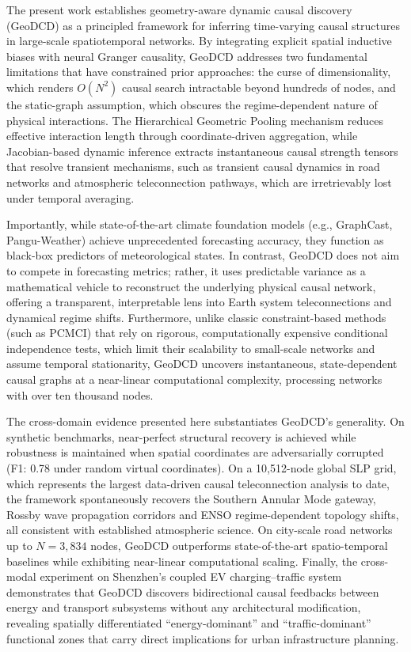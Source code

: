 \documentclass{article}
\begin{document}
The present work establishes geometry-aware dynamic causal discovery (GeoDCD) as a principled framework for inferring time-varying causal structures in large-scale spatiotemporal networks. By integrating explicit spatial inductive biases with neural Granger causality, GeoDCD addresses two fundamental limitations that have constrained prior approaches: the curse of dimensionality, which renders $O(N^2)$ causal search intractable beyond hundreds of nodes, and the static-graph assumption, which obscures the regime-dependent nature of physical interactions. The Hierarchical Geometric Pooling mechanism reduces effective interaction length through coordinate-driven aggregation, while Jacobian-based dynamic inference extracts instantaneous causal strength tensors that resolve transient mechanisms, such as transient causal dynamics in road networks and atmospheric teleconnection pathways, which are irretrievably lost under temporal averaging.

Importantly, while state-of-the-art climate foundation models (e.g., GraphCast, Pangu-Weather) achieve unprecedented forecasting accuracy, they function as black-box predictors of meteorological states. In contrast, GeoDCD does not aim to compete in forecasting metrics; rather, it uses predictable variance as a mathematical vehicle to reconstruct the underlying physical causal network, offering a transparent, interpretable lens into Earth system teleconnections and dynamical regime shifts. Furthermore, unlike classic constraint-based methods (such as PCMCI) that rely on rigorous, computationally expensive conditional independence tests, which limit their scalability to small-scale networks and assume temporal stationarity, GeoDCD uncovers instantaneous, state-dependent causal graphs at a near-linear computational complexity, processing networks with over ten thousand nodes.

The cross-domain evidence presented here substantiates GeoDCD's generality. On synthetic benchmarks, near-perfect structural recovery is achieved while robustness is maintained when spatial coordinates are adversarially corrupted (F1: 0.78 under random virtual coordinates). On a 10,512-node global SLP grid, which represents the largest data-driven causal teleconnection analysis to date, the framework spontaneously recovers the Southern Annular Mode gateway, Rossby wave propagation corridors and ENSO regime-dependent topology shifts, all consistent with established atmospheric science. On city-scale road networks up to $N=3{,}834$ nodes, GeoDCD outperforms state-of-the-art spatio-temporal baselines while exhibiting near-linear computational scaling. Finally, the cross-modal experiment on Shenzhen's coupled EV charging--traffic system demonstrates that GeoDCD discovers bidirectional causal feedbacks between energy and transport subsystems without any architectural modification, revealing spatially differentiated ``energy-dominant'' and ``traffic-dominant'' functional zones that carry direct implications for urban infrastructure planning.
\end{document}
